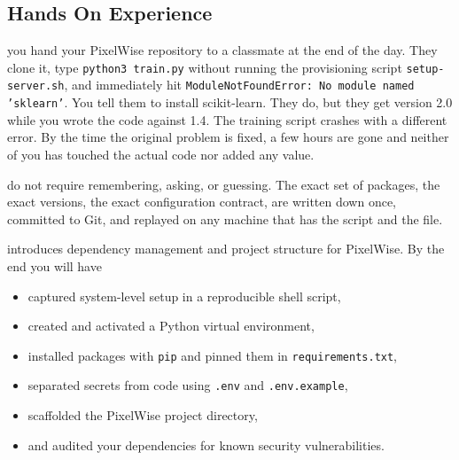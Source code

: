 \newpage
\subsection{Hands On Experience}

 you hand your PixelWise repository to a
classmate at the end of the day.
They clone it, type \texttt{python3 train.py} without running the provisioning script \texttt{setup-server.sh},
and immediately hit \texttt{ModuleNotFoundError: No module named 'sklearn'}.
You tell them to install scikit-learn.
They do, but they get version 2.0 while you wrote the code against 1.4.
The training script crashes with a different error.
By the time the original problem is fixed,
a few hours are gone and neither of you has touched the actual code nor added any value.


 do not require remembering, asking, or guessing.
The exact set of packages, the exact versions, the exact configuration
contract, are written down once, committed to Git, and replayed on any
machine that has the script and the file.


 introduces dependency management and project
structure for PixelWise.
By the end you will have
\begin{itemize}
    \item captured system-level setup in a reproducible shell script,
    \item created and activated a Python virtual environment,
    \item installed packages with \texttt{pip} and pinned them in \texttt{requirements.txt},
    \item separated secrets from code using \texttt{.env} and \texttt{.env.example},
    \item scaffolded the PixelWise project directory,
    \item and audited your dependencies for known security vulnerabilities.
\end{itemize}




